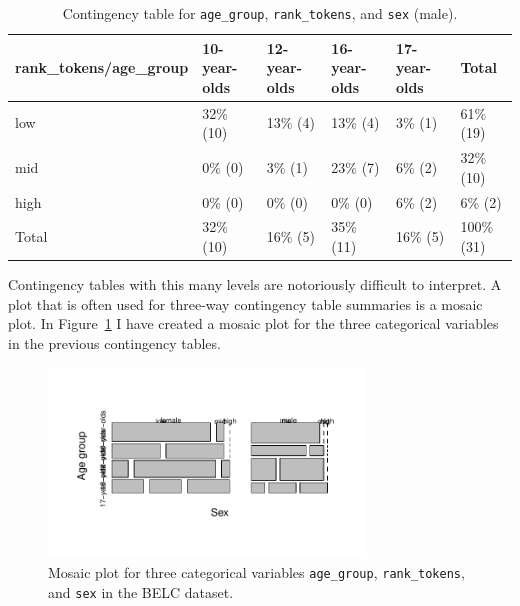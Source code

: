 \documentclass[
  letterpaper,
]{latex/krantz}
\begin{document}
\hypertarget{tbl-summaries-multivariate-categorical-table-belc-male}{}
\begin{table}
\caption{\label{tbl-summaries-multivariate-categorical-table-belc-male}Contingency table for \texttt{age\_group}, \texttt{rank\_tokens}, and
\texttt{sex} (male). }\tabularnewline

\centering
\begin{tabular}{llllll}
\toprule
rank\_tokens/age\_group & 10-year-olds & 12-year-olds & 16-year-olds & 17-year-olds & Total\\
\midrule
low & 32\% (10) & 13\% (4) & 13\%  (4) & 3\% (1) & 61\% (19)\\
mid & 0\%  (0) & 3\% (1) & 23\%  (7) & 6\% (2) & 32\% (10)\\
high & 0\%  (0) & 0\% (0) & 0\%  (0) & 6\% (2) & 6\%  (2)\\
Total & 32\% (10) & 16\% (5) & 35\% (11) & 16\% (5) & 100\% (31)\\
\bottomrule
\end{tabular}
\end{table}

Contingency tables with this many levels are notoriously difficult to
interpret. A plot that is often used for three-way contingency table
summaries is a mosaic plot. In
Figure~\ref{fig-summaries-multivariate-mosaic-belc} I have created a
mosaic plot for the three categorical variables in the previous
contingency tables.

\begin{figure}[h]

{\centering \includegraphics[width=0.75\textwidth,height=\textheight]{approaching-analysis_files/figure-pdf/fig-summaries-multivariate-mosaic-belc-1.pdf}

}

\caption{\label{fig-summaries-multivariate-mosaic-belc}Mosaic plot for
three categorical variables \texttt{age\_group}, \texttt{rank\_tokens},
and \texttt{sex} in the BELC dataset.}

\end{figure}
\end{document}
